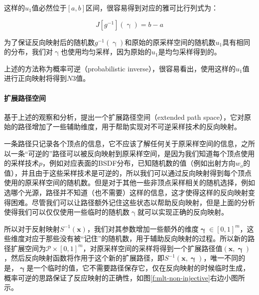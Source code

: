 \noindent 这样的$u_1$值必然位于$[a,b]$区间，很容易得到对应的雅可比行列式为：

\begin{equation}\label{e:mlt-intervals-2}
	J[g^{-1}](\upgamma)=b-a
\end{equation}

\noindent 为了保证反向映射后的随机数$g^{-1}(\upgamma)$和原始的原采样空间的随机数$u_1$具有相同的分布，我们对$\upgamma$也使用均匀采样，因为原始的$u_1$是均匀采样得到的。

上述的方法称为概率可逆（probabilistic inverse），很容易看出，使用这样的$u_1$值进行正向映射将得到$N3$值。




\paragraph{扩展路径空间}
基于上述的观察和分析，\cite{a:ReversibleJumpMetropolisLightTransportusingInverseMappings}提出一个扩展路径空间（extended path space），它对原始的路径增加了一些辅助维度，用于帮助实现对不可逆采样技术的反向映射。

一条路径只记录各个顶点的信息，它不应该了解任何关于原采样空间的信息，之所以一条“可逆的”路径可以被反向映射到原采样空间，是因为我们知道每个顶点使用的采样技术$p$，例如对应表面的BSDF分布，已知随机数的值（例如出射方向$w_o$的值），并且由于这些采样技术是可逆的，所以我们可以通过反向映射得到每个顶点使用的原采样空间的随机数。但是对于其他一些非顶点采样相关的随机选择，例如选哪个光源，路径并不知道（也不需要）这样的信息，这才使得这样的反向映射变得困难。尽管我们可以让路径额外记住这些状态以帮助反向映射，但是上面的分析使得我们可以仅仅使用一些临时的随机数$\upgamma$就可以实现正确的反向映射。

所以对于反射映射$S^{-1}({\mathbf{x}})$，我们对其参数增加一些额外的维度${\mathbf{\upgamma}}\in[0,1]^{m}$，这些维度对应于那些没有被“记住”的随机数，用于辅助反向映射的过程。所以新的路径扩展空间为$\mathcal{P}\times[0,1]^{m}$，对原采样空间的采样将得到一个扩展路径值$({\mathbf{x}},{\mathbf{\upgamma}})$，然后反向映射函数将作用于这个新的扩展路径，即$S^{-1}({\mathbf{x}},{\mathbf{\upgamma}})$，唯一不同的是，${\mathbf{\upgamma}}$是一个临时的值，它不需要路径保存它，仅在反向映射的时候临时生成，概率可逆的思路保证了反应映射的正确性，如图\ref{f:mlt-non-injective}右边小图所示。


